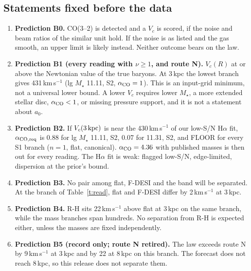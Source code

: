 \documentclass[10pt]{article}
\begin{document}
\subsection*{Statements fixed before the data}
\begin{enumerate}
\item \textbf{Prediction B0.} CO(3--2) is detected and a $V_c$ is scored, if the noise and beam ratios of the similar unit hold. If the noise is as listed and the gas smooth, an upper limit is likely instead. Neither outcome bears on the law.
\item \textbf{Prediction B1 (every reading with $\nu\ge1$, and route N).} $V_c(R)$ at or above the Newtonian value of the true baryons. At 3\,kpc the lowest branch gives 431\,km\,s$^{-1}$ (lg $M_\star$ 11.11, S2, $\alpha_{\rm CO}=1$). This is an input-grid minimum, not a universal lower bound. A lower $V_c$ requires lower $M_\star$, a more extended stellar disc, $\alpha_{\rm CO}<1$, or missing pressure support, and it is not a statement about $a_0$.
\item \textbf{Prediction B2.} If $V_c(3\,{\rm kpc})$ is near the 430\,km\,s$^{-1}$ of our low-S/N H$\alpha$ fit, $\alpha_{\rm CO,req}$ is 0.88 for lg $M_\star$ 11.11, S2, 0.07 for 11.31, S2, and FLOOR for every S1 branch ($n=1$, flat, canonical). $\alpha_{\rm CO}=4.36$ with published masses is then out for every reading. The H$\alpha$ fit is weak: flagged low-S/N, edge-limited, dispersion at the prior's bound.
\item \textbf{Prediction B3.} No pair among flat, F-DESI and the band will be separated. At the branch of Table~\ref{t:read}, flat and F-DESI differ by 2\,km\,s$^{-1}$ at 3\,kpc.
\item \textbf{Prediction B4.} R-H sits 22\,km\,s$^{-1}$ above flat at 3\,kpc on the same branch, while the mass branches span hundreds. No separation from R-H is expected either, unless the masses are fixed independently.
\item \textbf{Prediction B5 (record only; route N retired).} The law exceeds route N by 9\,km\,s$^{-1}$ at 3\,kpc and by 22 at 8\,kpc on this branch. The forecast does not reach 8\,kpc, so this release does not separate them.
\end{enumerate}
\end{document}

